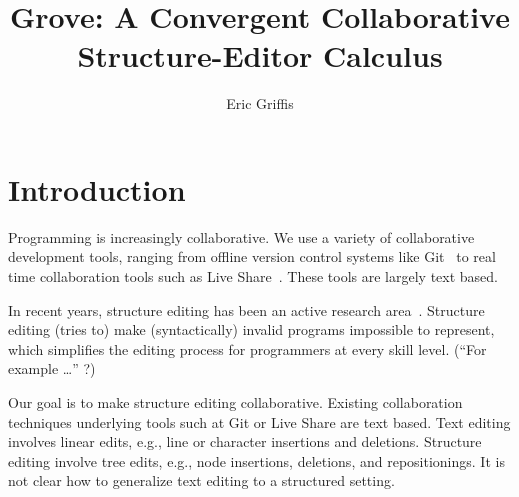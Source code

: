 \documentclass[nonacm, acmsmall, screen, review]{acmart}
\begin{document}
\title[Grove]{Grove: A Convergent Collaborative Structure-Editor Calculus}


\author{Eric Griffis}


\maketitle


\section{Introduction}


Programming is increasingly collaborative.
We use a variety of collaborative development tools, ranging from offline version control systems like Git~\cite{chacon_pro_2014} to real time collaboration tools such as Live Share~\cite{noauthor_use_nodate}.
These tools are largely text based.

In recent years, structure editing has been an active research area~\cite{resnick_scratch_2009, voelter_language_2011, omar_hazelnut_2017,noauthor_webflow_nodate}.
Structure editing (tries to) make (syntactically) invalid programs impossible to represent, which simplifies the editing process for programmers at every skill level.
(``For example \ldots'' ?)

Our goal is to make structure editing collaborative.
Existing collaboration techniques underlying tools such at Git or Live Share are text based.
Text editing involves linear edits, e.g., line or character insertions and deletions.
Structure editing involve tree edits, e.g., node insertions, deletions, and repositionings.
It is not clear how to generalize text editing to a structured setting.
\end{document}

